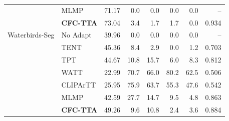 \begin{table}[t]
\begin{tabular}{llrrrrrr}
 & MLMP & 71.17 & 0.0 & 0.0 & 0.0 & 0.0 & -- \\
 & \textbf{CFC-TTA} & 73.04 & 3.4 & 1.7 & 1.7 & 0.0 & 0.934 \\
\midrule
Waterbirds-Seg & No Adapt & 39.96 & 0.0 & 0.0 & 0.0 & 0.0 & -- \\
 & TENT & 45.36 & 8.4 & 2.9 & 0.0 & 1.2 & 0.703 \\
 & TPT & 44.67 & 10.8 & 15.7 & 6.0 & 8.3 & 0.812 \\
 & WATT & 22.99 & 70.7 & 66.0 & 80.2 & 62.5 & 0.506 \\
 & CLIPArTT & 25.95 & 75.9 & 63.7 & 55.3 & 47.6 & 0.542 \\
 & MLMP & 42.59 & 27.7 & 14.7 & 9.5 & 4.8 & 0.863 \\
 & \textbf{CFC-TTA} & 49.26 & 9.6 & 10.8 & 2.4 & 3.6 & 0.884 \\
\bottomrule
\end{tabular}
\end{table}
